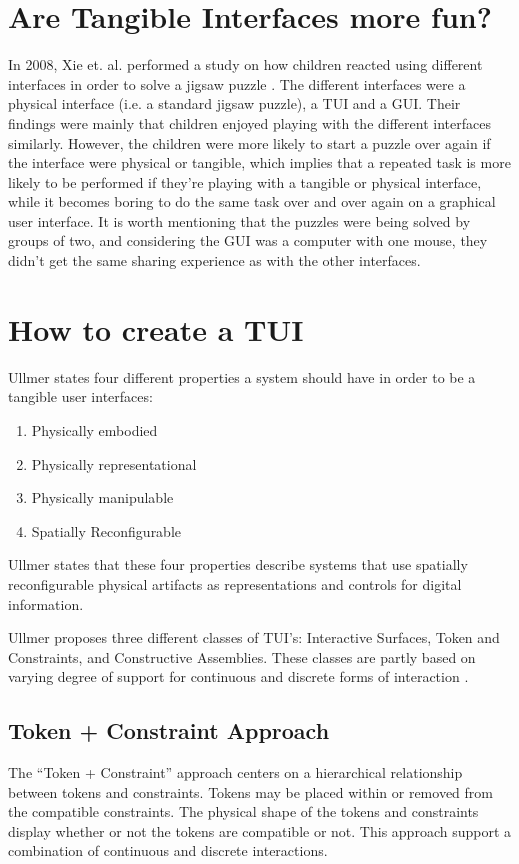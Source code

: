 \section{Are Tangible Interfaces more fun?}
\label{sec:aretuisfun}
In 2008, Xie et. al. performed a study on how children reacted using different interfaces in order to solve a jigsaw puzzle \cite{xie2008tangibles}. The different interfaces were a physical interface (i.e. a standard jigsaw puzzle), a TUI and a GUI. Their findings were mainly that children enjoyed playing with the different interfaces similarly. However, the children were more likely to start a puzzle over again if the interface were physical or tangible, which implies that a repeated task is more likely to be performed if they're playing with a tangible or physical interface, while it becomes boring to do the same task over and over again on a graphical user interface. It is worth mentioning that the puzzles were being solved by groups of two, and considering the GUI was a computer with one mouse, they didn't get the same sharing experience as with the other interfaces. 


\section{How to create a TUI}
Ullmer states four different properties a system should have in order to be a tangible user interfaces\cite{ullmer2002tangible}:

\begin{enumerate}
	\item{Physically embodied}
	\item{Physically representational}
	\item{Physically manipulable}
	\item{Spatially Reconfigurable}
\end{enumerate}

Ullmer states that these four properties describe systems that use spatially reconfigurable physical artifacts as representations and controls for digital information. 


Ullmer proposes three different classes of TUI's: Interactive Surfaces, Token and Constraints, and Constructive Assemblies. These classes are partly based on varying degree of support for continuous and discrete forms of interaction \cite{ullmer2002tangible}.


\subsection{Token + Constraint Approach}
The ``Token + Constraint'' approach centers on a hierarchical relationship between tokens and constraints. Tokens may be placed within or removed from the compatible constraints. The physical shape of the tokens and constraints display whether or not the tokens are compatible or not. This approach support a combination of continuous and discrete interactions. 

